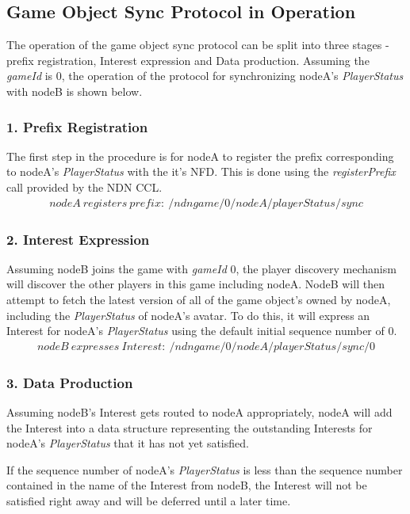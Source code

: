 \subsection{Game Object Sync Protocol in Operation}
The operation of the game object sync protocol can be split into three stages - prefix registration, Interest expression and Data production. Assuming the \textit{gameId} is 0, the operation of the protocol for synchronizing nodeA's \textit{PlayerStatus} with nodeB is shown below.

\subsubsection{1. Prefix Registration}
The first step in the procedure is for nodeA to register the prefix corresponding to nodeA's \textit{PlayerStatus} with the it's NFD. This is done using the \textit{registerPrefix} call provided by the NDN CCL.
\begin{align*}
    nodeA\ registers\ prefix:\ /ndngame/0/nodeA/playerStatus/sync
\end{align*}



\subsubsection{2. Interest Expression}
Assuming nodeB joins the game with \textit{gameId} 0, the player discovery mechanism will discover the other players in this game including nodeA. NodeB will then attempt to fetch the latest version of all of the game object's owned by nodeA, including the \textit{PlayerStatus} of nodeA's avatar. To do this, it will express an Interest for nodeA's \textit{PlayerStatus} using the default initial sequence number of 0.
\begin{align*}
    nodeB\ expresses\ Interest:\ /ndngame/0/nodeA/playerStatus/sync/0
\end{align*}

\subsubsection{3. Data Production}
Assuming nodeB's Interest gets routed to nodeA appropriately, nodeA will add the Interest into a data structure representing the outstanding Interests for nodeA's \textit{PlayerStatus} that it has not yet satisfied.

If the sequence number of nodeA's \textit{PlayerStatus} is less than the sequence number contained in the name of the Interest from nodeB, the Interest will not be satisfied right away and will be deferred until a later time.

